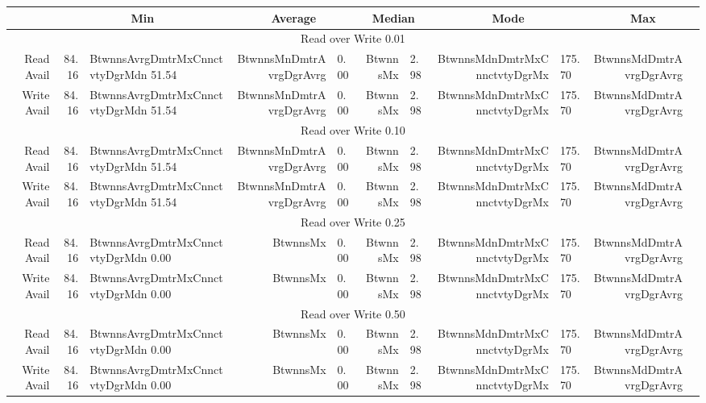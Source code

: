 

\begin{tabular}{r | r l | r l | r l | r l | r l}
& \multicolumn{2}{c|}{Min} & %
	\multicolumn{2}{c|}{Average} & %
	\multicolumn{2}{c|}{Median} & %
	\multicolumn{2}{c|}{Mode} & %
	\multicolumn{2}{c}{Max} \\ \hline
\multicolumn{11}{c}{Read over Write 0.01} \\ \hline
Read Avail & 84.16 & BtwnnsAvrgDmtrMxCnnctvtyDgrMdn  51.54 & BtwnnsMnDmtrAvrgDgrAvrg &   0.00 & BtwnnsMx &          2.98 & BtwnnsMdnDmtrMxCnnctvtyDgrMx &   175.70 & BtwnnsMdDmtrAvrgDgrAvrg \\
Write Avail & 84.16 & BtwnnsAvrgDmtrMxCnnctvtyDgrMdn  51.54 & BtwnnsMnDmtrAvrgDgrAvrg &   0.00 & BtwnnsMx &          2.98 & BtwnnsMdnDmtrMxCnnctvtyDgrMx &   175.70 & BtwnnsMdDmtrAvrgDgrAvrg \\ \hline
\multicolumn{11}{c}{Read over Write 0.10} \\ \hline
Read Avail & 84.16 & BtwnnsAvrgDmtrMxCnnctvtyDgrMdn  51.54 & BtwnnsMnDmtrAvrgDgrAvrg &   0.00 & BtwnnsMx &          2.98 & BtwnnsMdnDmtrMxCnnctvtyDgrMx &   175.70 & BtwnnsMdDmtrAvrgDgrAvrg  \\
Write Avail & 84.16 & BtwnnsAvrgDmtrMxCnnctvtyDgrMdn  51.54 & BtwnnsMnDmtrAvrgDgrAvrg &   0.00 & BtwnnsMx &          2.98 & BtwnnsMdnDmtrMxCnnctvtyDgrMx &   175.70 & BtwnnsMdDmtrAvrgDgrAvrg \\ \hline
\multicolumn{11}{c}{Read over Write 0.25} \\ \hline
Read Avail & 84.16 & BtwnnsAvrgDmtrMxCnnctvtyDgrMdn  0.00 & BtwnnsMx &                   0.00 & BtwnnsMx &          2.98 & BtwnnsMdnDmtrMxCnnctvtyDgrMx &   175.70 & BtwnnsMdDmtrAvrgDgrAvrg  \\
Write Avail & 84.16 & BtwnnsAvrgDmtrMxCnnctvtyDgrMdn  0.00 & BtwnnsMx &                   0.00 & BtwnnsMx &          2.98 & BtwnnsMdnDmtrMxCnnctvtyDgrMx &   175.70 & BtwnnsMdDmtrAvrgDgrAvrg  \\ \hline
\multicolumn{11}{c}{Read over Write 0.50} \\ \hline
Read Avail & 84.16 & BtwnnsAvrgDmtrMxCnnctvtyDgrMdn  0.00 & BtwnnsMx &                   0.00 & BtwnnsMx &          2.98 & BtwnnsMdnDmtrMxCnnctvtyDgrMx &   175.70 & BtwnnsMdDmtrAvrgDgrAvrg  \\
Write Avail & 84.16 & BtwnnsAvrgDmtrMxCnnctvtyDgrMdn  0.00 & BtwnnsMx &                   0.00 & BtwnnsMx &          2.98 & BtwnnsMdnDmtrMxCnnctvtyDgrMx &   175.70 & BtwnnsMdDmtrAvrgDgrAvrg  \\ \hline

\end{tabular}
